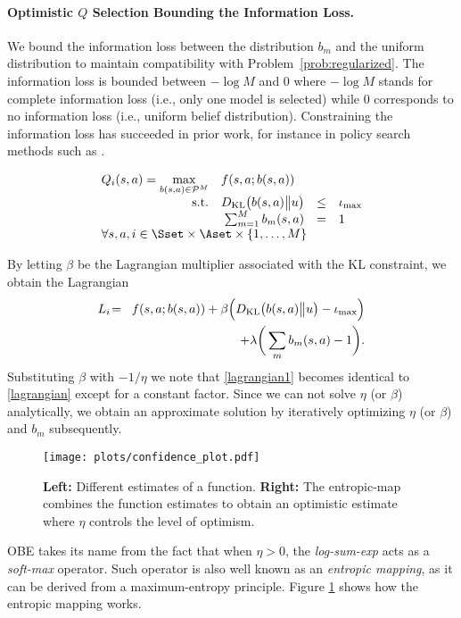\paragraph{Optimistic $Q$ Selection Bounding the Information Loss.}
We bound the information loss between the distribution $b_m$ and the uniform distribution to maintain compatibility with Problem~\ref{prob:regularized}. The information loss is bounded between $-\log M$ and $0$ where  $-\log M$ stands for complete information loss (i.e., only one model is selected) while $0$ corresponds to no information loss (i.e., uniform belief distribution). Constraining the information loss has succeeded in prior work, for instance in policy search methods such as \cite{peters2010relative}.
\begin{probdef}
	\begin{equation}
	\begin{array}{rrclcl}
	\displaystyle Q_i(s,a) = \max_{b(s,a) \in \mathcal{P}^M} & \multicolumn{3}{l}{f(s,a;b(s,a))\nonumber } \\
	\text{s.t.} & D_{\mathrm{KL}}\big(b(s,a)\big{\|} u \big)& \leq & \iota_{\max} \\
	& \sum_{m=1}^{M} b_m(s,a) & = & 1 \\
	\multicolumn{4}{l}{ \forall s,a,i \in \Sset \times \Aset \times \{1,\dots,M\}}
	\end{array} \nonumber
	\end{equation}
	\label{constrversion}
\end{probdef}
By letting $\beta$ be the Lagrangian multiplier associated with the KL constraint, we obtain the Lagrangian
\begin{eqnarray}
L_i &\! = \!& f(s,a;b(s,a)) + \beta \Bigl(D_{\mathrm{KL}}\big(b(s,a)\big{\|}u\big) - \iota_{\max} \Bigr) \nonumber \\
& &   + \lambda\bigg(\sum_m b_m(s,a) - 1\bigg). \label{lagrangian1}
\end{eqnarray}
Substituting $\beta$ with $-1/\eta$ we note that \eqref{lagrangian1} becomes identical to \eqref{lagrangian} except for a constant factor. Since we can not solve $\eta$ (or $\beta$) analytically, we obtain an approximate solution by iteratively optimizing $\eta$ (or $\beta$) and $b_m$ subsequently.
\begin{figure}
	\texttt{[image: plots/confidence\_plot.pdf]}
	\caption{\textbf{Left:} Different estimates of a function. \textbf{Right:} The entropic-map combines the function estimates to obtain an optimistic estimate where $\eta$ controls the level of optimism.}
	\label{fig:uncertainty}
\end{figure}
OBE takes its name from the fact that when $\eta > 0$, the \textsl{log-sum-exp} acts as a \textsl{soft-max} operator. Such operator is also well known as an \textsl{entropic mapping}, as it can be derived from a maximum-entropy principle. Figure \ref{fig:uncertainty} shows how the entropic mapping works.

